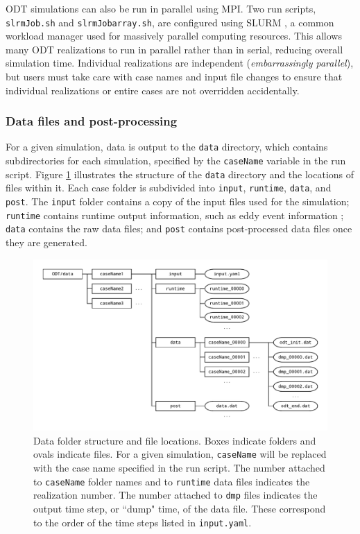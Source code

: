\documentclass[preprint,12pt, a4paper]{elsarticle}
\begin{document}
ODT simulations can also be run in parallel using MPI. Two run scripts, \texttt{slrmJob.sh} and \texttt{slrmJob\textunderscore array.sh}, are configured using SLURM \cite{Yoo_2003}, a common workload manager used for massively parallel computing resources. This allows many ODT realizations to run in parallel rather than in serial, reducing overall simulation time. Individual realizations are independent (\emph{embarrassingly parallel}), but users must take care with case names and input file changes to ensure that individual realizations or entire cases are not overridden accidentally. 

\subsubsection{Data files and post-processing}

For a given simulation, data is output to the \texttt{data} directory, which contains subdirectories for each simulation, specified by the \texttt{caseName} variable in the run script. Figure \ref{fig:data_folder_structure} illustrates the structure of the \texttt{data} directory and the locations of files within it. Each case folder is subdivided into \texttt{input}, \texttt{runtime}, \texttt{data}, and \texttt{post}. The \texttt{input} folder contains a copy of the input files used for the simulation; \texttt{runtime} contains runtime output information, such as eddy event information ; \texttt{data} contains the raw data files; and \texttt{post} contains post-processed data files once they are generated. 

\begin{figure}
	\centering
	\includegraphics[width=\textwidth]{../figures/data_folder_structure.pdf} 
	\caption{Data folder structure and file locations. Boxes indicate folders and ovals indicate files. For a given simulation, \texttt{caseName} will be replaced with the case name specified in the run script. The number attached to \texttt{caseName} folder names and to \texttt{runtime} data files indicates the realization number. The number attached to \texttt{dmp} files indicates the output time step, or ``dump" time, of the data file. These correspond to the order of the time steps listed in \texttt{input.yaml}.}
	\label{fig:data_folder_structure}
\end{figure}
\end{document}
